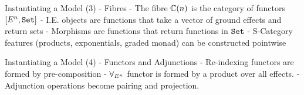 \documentclass{beamer}
\begin{document}
\begin{frame}{Instantiating a Model (3) - Fibres}
    - The fibre $\mathbb{C}(n)$ is the category of functors $[E^n, \texttt{Set}]$
    - I.E. objects are functions that take a vector of ground effects and return sets
    - Morphisms are functions that return functions in $\texttt{Set}$
    - S-Category features (products, exponentials, graded monad) can be constructed pointwise
\end{frame}

\begin{frame}{Instantiating a Model (4) - Functors and Adjunctions}
    - Re-indexing functors are formed by pre-composition
    - $\forall_{E^n}$ functor is formed by a product over all effects.
    - Adjunction operations become pairing and projection.
\end{frame}
\end{document}
